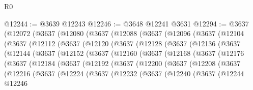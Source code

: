 \begin{lexlean}{R0}
\begin{coremodule}
@12244 := @3639 @12243
@12246 := @3648 @12241 @3631
@12294 := @3637
    (@12072
      (@3637
        (@12080
          (@3637
            (@12088
              (@3637
                (@12096
                  (@3637
                    (@12104
                      (@3637
                        (@12112
                          (@3637
                            (@12120
                              (@3637
                                (@12128
                                  (@3637
                                    (@12136
                                      (@3637
                                        (@12144
                                          (@3637
                                            (@12152
                                              (@3637
                                                (@12160
                                                  (@3637
                                                    (@12168
                                                      (@3637
                                                        (@12176
                                                          (@3637
                                                            (@12184
                                                              (@3637
                                                                (@12192
                                                                  (@3637
                                                                    (@12200
                                                                      (@3637
                                                                        (@12208
                                                                          (@3637
                                                                            (@12216
                                                                              (@3637
                                                                                (@12224
                                                                                  (@3637
                                                                                    (@12232
                                                                                      (@3637
                                                                                        (@12240
                                                                                          (@3637
                                                                                            (@12244
                                                                                              @12246

\end{coremodule}
\end{lexlean}
